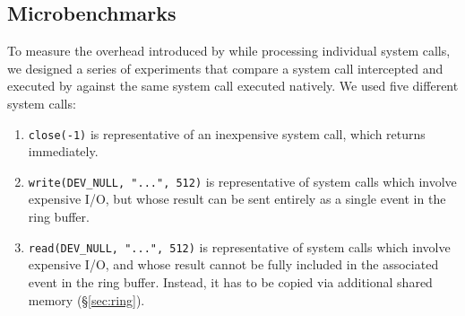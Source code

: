 \subsection{Microbenchmarks}
\label{sec:microbenchmarks}

To measure the overhead introduced by \varan while processing individual
system calls, we designed a series of experiments that compare a
system call intercepted and executed by \varan against the same system
call executed natively. We used five different system calls:

\begin{enumerate}


\item \lstinline`close(-1)` is representative of an inexpensive system call,
  which returns immediately.


\item \lstinline`write(DEV_NULL, "...", 512)` is representative of system
  calls which involve expensive I/O, but whose result can be sent
  entirely as a single event in the ring buffer.


\item \lstinline`read(DEV_NULL, "...", 512)` is representative of system calls which
  involve expensive I/O, and whose result cannot be fully included in the
  associated event in the ring buffer.  Instead, it has to be copied via
  additional shared memory (\S\ref{sec:ring}).



\end{enumerate}
